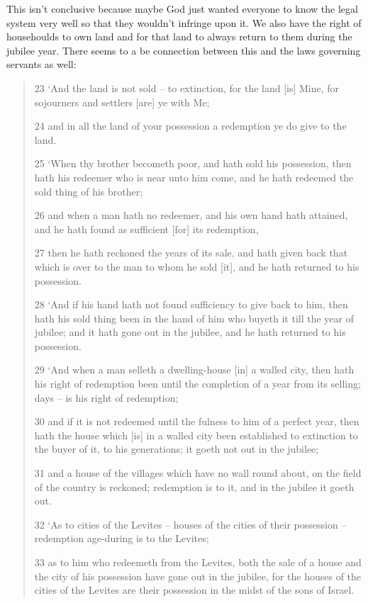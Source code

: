 \documentclass[11pt]{article}
\begin{document}
This isn't conclusive because maybe God just wanted everyone to know the legal system very well so that they wouldn't infringe upon it. We also have the right of househoulds to own land and for that land to always return to them during the jubilee year. There seems to a be connection between this and the laws governing servants as well:
\begin{quote}
23 `And the land is not sold -- to extinction, for the land [is] Mine, for sojourners and settlers [are] ye with Me;

24 and in all the land of your possession a redemption ye do give to the land.

25 `When thy brother becometh poor, and hath sold his possession, then hath his redeemer who is near unto him come, and he hath redeemed the sold thing of his brother;

26 and when a man hath no redeemer, and his own hand hath attained, and he hath found as sufficient [for] its redemption,

27 then he hath reckoned the years of its sale, and hath given back that which is over to the man to whom he sold [it], and he hath returned to his possession.

28 `And if his hand hath not found sufficiency to give back to him, then hath his sold thing been in the hand of him who buyeth it till the year of jubilee; and it hath gone out in the jubilee, and he hath returned to his possession.

29 `And when a man selleth a dwelling-house [in] a walled city, then hath his right of redemption been until the completion of a year from its selling; days -- is his right of redemption;

30 and if it is not redeemed until the fulness to him of a perfect year, then hath the house which [is] in a walled city been established to extinction to the buyer of it, to his generations; it goeth not out in the jubilee;

31 and a house of the villages which have no wall round about, on the field of the country is reckoned; redemption is to it, and in the jubilee it goeth out.

32 `As to cities of the Levites -- houses of the cities of their possession -- redemption age-during is to the Levites;

33 as to him who redeemeth from the Levites, both the sale of a house and the city of his possession have gone out in the jubilee, for the houses of the cities of the Levites are their possession in the midst of the sons of Israel.


\end{quote}
\end{document}
